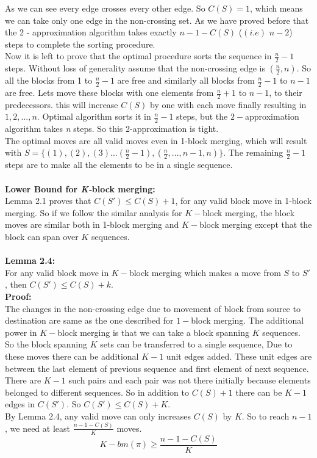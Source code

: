 \documentclass[BTech]{iitmdiss}
\begin{document}
\noindent
As we can see every edge crosses every other edge. So $C(S) = 1$, which means we can take only one edge in the non-crossing set. As we have proved before that the 2 - approximation algorithm takes exactly $n-1-C(S)$ ($(i.e)$ $n-2$) steps to complete the sorting procedure.\\
Now it is left to prove that the optimal procedure sorts the sequence in $\frac{n}{2} - 1$ steps. Without loss of generality assume that the non-crossing edge is $(\frac{n}{2},n)$. So all the blocks from 1 to $\frac{n}{2} - 1$ are free and similarly all blocks from $\frac{n}{2} - 1$ to $n-1$ are free. Lets move these blocks with one elements from $\frac{n}{2} + 1$ to $n-1$, to their predecessors. this will increase $C(S)$ by one with each move finally resulting in $1,2,...,n$. Optimal algorithm sorts it in  $\frac{n}{2} - 1$ steps, but the $2-$approximation algorithm takes \textit{n} steps. So this 2-approximation is tight.\\
The optimal moves are all valid moves even in 1-block merging, which will result with $S = \{(1),(2),(3)...(\frac{n}{2}-1),(\frac{n}{2},...,n-1,n)\}$. The remaining $\frac{n}{2} - 1$ steps are to make all the elements to be in a single sequence.\\~\\
\textbf{Lower Bound for \textit{K-}block merging:}\\
Lemma 2.1 proves that $C(S') \leq C(S) + 1$, for any valid block move in 1-block merging. So if we follow the similar analysis for $K-$block merging, the block moves are similar both in 1-block merging and $K-$block merging except that the block can span over $K$ sequences.\\~\\
\textbf{Lemma 2.4:}\\
For any valid block move in $K-$block merging which makes a move from $S$ to $S'$, then $C(S') \leq C(S) + k.$\\
\textbf{Proof:}\\
The changes in the non-crossing edge due to movement of block from source to destination are same as the one described for $1-$block merging. The additional power in $K-$block merging is that we can take a block spanning $K$ sequences. So the block spanning $K$ sets can be transferred to a single sequence, Due to these moves there can be additional $K-1$ unit edges added. These unit edges are between the last element of previous sequence and first element of next sequence. There are $K-1$ such pairs and each pair was not there initially because elements belonged to different sequences. So in addition to $C(S) + 1$ there can be $K-1$ edges in $C(S')$. So $C(S') \leq C(S) + K$. 
\\
By Lemma 2.4, any valid move can only increases $C(S)$ by $K$. So to reach $n-1$, we need at least $\frac{n-1-C(S)}{K}$ moves.
$$K-bm(\pi) \geq \frac{n-1-C(S)}{K}$$
\end{document}
